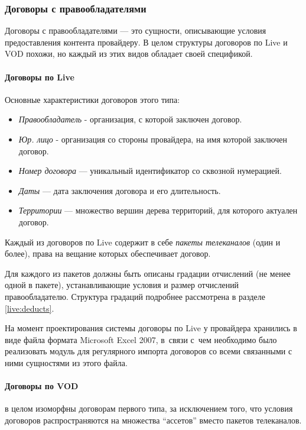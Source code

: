 \subsubsection{Договоры с правообладателями}

Договоры с правообладателями --- это сущности, описывающие условия предоставления контента провайдеру.
В целом структуры договоров по Live и VOD похожи, но каждый из этих видов обладает своей спецификой.

\paragraph{Договоры по Live}
Основные характеристики договоров этого типа:

\begin{itemize}
\item{
  \textit{Правообладатель} - организация, с которой заключен договор.
}
\item{
  \textit{Юр. лицо} -  организация со стороны провайдера, на имя которой заключен договор.
}
\item{
  \textit{Номер договора} ---  уникальный идентификатор со сквозной нумерацией.
}
\item{
  \textit{Даты} --- дата заключения договора и его длительность.
}
\item{
  \textit{Территории} --- множество вершин дерева территорий, для которого актуален договор.
}
\end{itemize}

Каждый из договоров по Live содержит в себе \textit{пакеты телеканалов} (один и более), права на вещание которых обеспечивает договор.

Для каждого из пакетов должны быть описаны градации отчислений (не менее одной в пакете), устанавливающие условия и размер
отчислений правообладателю. Структура градаций подробнее рассмотрена в разделе \ref{live:deducts}.

На момент проектирования системы договоры по Live у провайдера хранились в виде файла формата Microsoft Excel 2007, в~связи с~чем
необходимо было реализовать модуль для регулярного импорта договоров со всеми связанными с ними сущностями из этого файла.

\paragraph{Договоры по VOD} в целом изоморфны договорам первого типа, за исключением того, что условия договоров распространяются на множества ``ассетов''
вместо пакетов телеканалов.

